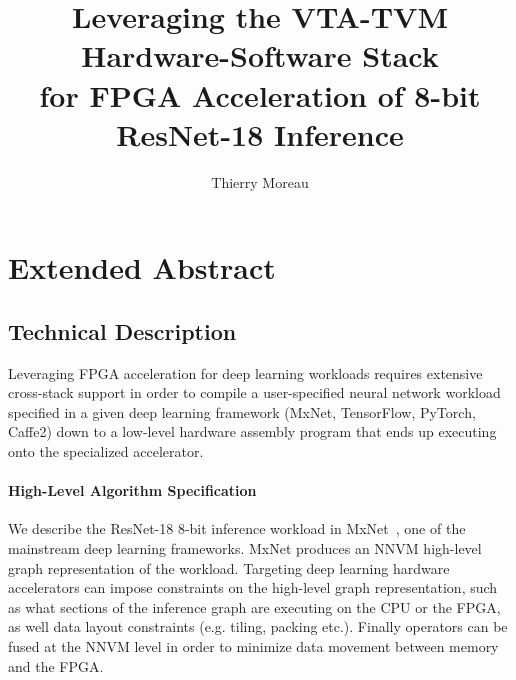 \documentclass[sigconf]{acmart}
\begin{document}

\title{Leveraging the VTA-TVM Hardware-Software Stack \\for FPGA Acceleration of 8-bit ResNet-18 Inference}

\author{Thierry Moreau}

\renewcommand{\shortauthors}{}
\renewcommand{\shorttitle}{}

\maketitle


\section{Extended Abstract}



\subsection{Technical Description}

Leveraging FPGA acceleration for deep learning workloads requires extensive cross-stack support in order to compile a user-specified neural network workload specified in a given deep learning framework (MxNet, TensorFlow, PyTorch, Caffe2) down to a low-level hardware assembly program that ends up executing onto the specialized accelerator.

\paragraph{High-Level Algorithm Specification}
We describe the ResNet-18 8-bit inference workload in MxNet~\cite{MXNet-whitepaper}, one of the mainstream deep learning frameworks.
MxNet produces an NNVM high-level graph representation of the workload.
Targeting deep learning hardware accelerators can impose constraints on the high-level graph representation, such as what sections of the inference graph are executing on the CPU or the FPGA, as well data layout constraints (e.g. tiling, packing etc.).
Finally operators can be fused at the NNVM level in order to minimize data movement between memory and the FPGA.
\end{document}
